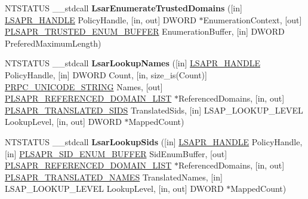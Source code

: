 \begin{DoxyCompactItemize}
\item 
\mbox{\label{interfacelsarpc_a9d735ed3ce1b45b726510391e85368b1}} 
N\+T\+S\+T\+A\+T\+US \+\_\+\+\_\+stdcall {\bfseries Lsar\+Enumerate\+Trusted\+Domains} (\mbox{[}in\mbox{]} \hyperlink{interfacevoid}{L\+S\+A\+P\+R\+\_\+\+H\+A\+N\+D\+LE} Policy\+Handle, \mbox{[}in, out\mbox{]} D\+W\+O\+RD $\ast$Enumeration\+Context, \mbox{[}out\mbox{]} \hyperlink{struct___l_s_a_p_r___t_r_u_s_t_e_d___e_n_u_m___b_u_f_f_e_r}{P\+L\+S\+A\+P\+R\+\_\+\+T\+R\+U\+S\+T\+E\+D\+\_\+\+E\+N\+U\+M\+\_\+\+B\+U\+F\+F\+ER} Enumeration\+Buffer, \mbox{[}in\mbox{]} D\+W\+O\+RD Prefered\+Maximum\+Length)
\item 
\mbox{\label{interfacelsarpc_af4d37b9db61032865da70fccba96c112}} 
N\+T\+S\+T\+A\+T\+US \+\_\+\+\_\+stdcall {\bfseries Lsar\+Lookup\+Names} (\mbox{[}in\mbox{]} \hyperlink{interfacevoid}{L\+S\+A\+P\+R\+\_\+\+H\+A\+N\+D\+LE} Policy\+Handle, \mbox{[}in\mbox{]} D\+W\+O\+RD Count, \mbox{[}in, size\+\_\+is(Count)\mbox{]} \hyperlink{struct___r_p_c___u_n_i_c_o_d_e___s_t_r_i_n_g}{P\+R\+P\+C\+\_\+\+U\+N\+I\+C\+O\+D\+E\+\_\+\+S\+T\+R\+I\+NG} Names, \mbox{[}out\mbox{]} \hyperlink{struct___l_s_a_p_r___r_e_f_e_r_e_n_c_e_d___d_o_m_a_i_n___l_i_s_t}{P\+L\+S\+A\+P\+R\+\_\+\+R\+E\+F\+E\+R\+E\+N\+C\+E\+D\+\_\+\+D\+O\+M\+A\+I\+N\+\_\+\+L\+I\+ST} $\ast$Referenced\+Domains, \mbox{[}in, out\mbox{]} \hyperlink{struct___l_s_a_p_r___t_r_a_n_s_l_a_t_e_d___s_i_d_s}{P\+L\+S\+A\+P\+R\+\_\+\+T\+R\+A\+N\+S\+L\+A\+T\+E\+D\+\_\+\+S\+I\+DS} Translated\+Sids, \mbox{[}in\mbox{]} L\+S\+A\+P\+\_\+\+L\+O\+O\+K\+U\+P\+\_\+\+L\+E\+V\+EL Lookup\+Level, \mbox{[}in, out\mbox{]} D\+W\+O\+RD $\ast$Mapped\+Count)
\item 
\mbox{\label{interfacelsarpc_a0cb4ea774df4716a839cc8f59c1b414d}} 
N\+T\+S\+T\+A\+T\+US \+\_\+\+\_\+stdcall {\bfseries Lsar\+Lookup\+Sids} (\mbox{[}in\mbox{]} \hyperlink{interfacevoid}{L\+S\+A\+P\+R\+\_\+\+H\+A\+N\+D\+LE} Policy\+Handle, \mbox{[}in\mbox{]} \hyperlink{struct___l_s_a_p_r___s_i_d___e_n_u_m___b_u_f_f_e_r}{P\+L\+S\+A\+P\+R\+\_\+\+S\+I\+D\+\_\+\+E\+N\+U\+M\+\_\+\+B\+U\+F\+F\+ER} Sid\+Enum\+Buffer, \mbox{[}out\mbox{]} \hyperlink{struct___l_s_a_p_r___r_e_f_e_r_e_n_c_e_d___d_o_m_a_i_n___l_i_s_t}{P\+L\+S\+A\+P\+R\+\_\+\+R\+E\+F\+E\+R\+E\+N\+C\+E\+D\+\_\+\+D\+O\+M\+A\+I\+N\+\_\+\+L\+I\+ST} $\ast$Referenced\+Domains, \mbox{[}in, out\mbox{]} \hyperlink{struct___l_s_a_p_r___t_r_a_n_s_l_a_t_e_d___n_a_m_e_s}{P\+L\+S\+A\+P\+R\+\_\+\+T\+R\+A\+N\+S\+L\+A\+T\+E\+D\+\_\+\+N\+A\+M\+ES} Translated\+Names, \mbox{[}in\mbox{]} L\+S\+A\+P\+\_\+\+L\+O\+O\+K\+U\+P\+\_\+\+L\+E\+V\+EL Lookup\+Level, \mbox{[}in, out\mbox{]} D\+W\+O\+RD $\ast$Mapped\+Count)

\end{DoxyCompactItemize}
